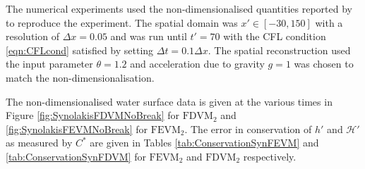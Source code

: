 The numerical experiments used the non-dimensionalised quantities reported by \citet{Synolakis-1987-523} to reproduce the experiment. The spatial domain was $x' \in [-30,150]$ with a resolution of $\Delta x = 0.05$ and was run until $t' = 70$ with the CFL condition \eqref{eqn:CFLcond} satisfied by setting $\Delta t = 0.1 \Delta x$. The spatial reconstruction used the input parameter $\theta = 1.2$ and acceleration due to gravity $g= 1$ was chosen to match the non-dimensionalisation.

The non-dimensionalised water surface data is given at the various times in Figure \ref{fig:SynolakisFDVMNoBreak} for $\text{FDVM}_2$ and \ref{fig:SynolakisFEVMNoBreak} for $\text{FEVM}_2$. The error in conservation of $h'$ and $\mathcal{H}'$ as measured by $C^*$ are given in Tables \ref{tab:ConservationSynFEVM} and \ref{tab:ConservationSynFDVM} for $\text{FEVM}_2$ and $\text{FDVM}_2$ respectively. 

